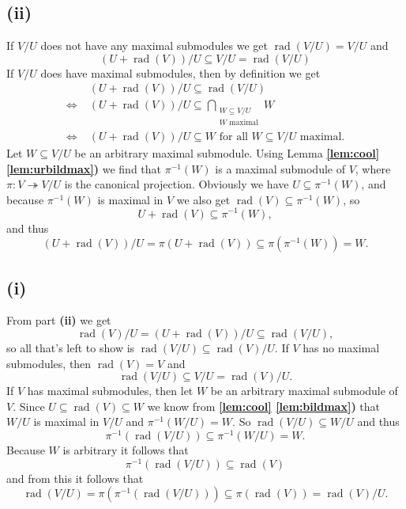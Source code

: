 \documentclass[a4paper,10pt]{article}
\theoremstyle{definition}
\newcommand{\rad}{\operatorname{rad}}
\begin{document}
\subsection*{(ii)}
If $V\!/U$ does not have any maximal submodules we get $\rad(V\!/U) = V\!/U$ and
\[
 (U+\rad(V))/U \subseteq V\!/U = \rad(V\!/U)
\]
If $V\!/U$ does have maximal submodules, then by definition we get
\begin{align*}
 &\; (U + \rad(V))/U \subseteq \rad(V\!/U) \\
 \Leftrightarrow&\; (U + \rad(V))/U \subseteq \bigcap_{\substack{W \subseteq V\!/U \\ W \text{ maximal}}} W \\
 \Leftrightarrow&\; (U + \rad(V))/U \subseteq W \text{ for all } W \subseteq V\!/U \text{ maximal}.
\end{align*}
Let $W \subseteq V\!/U$ be an arbitrary maximal submodule. Using Lemma \textbf{\ref{lem:cool} \ref{lem:urbildmax})} we find that $\pi^{-1}(W)$ is a maximal submodule of $V$, where $\pi : V \twoheadrightarrow V/U$ is the canonical projection. Obviously we have $U \subseteq \pi^{-1}(W)$, and because $\pi^{-1}(W)$ is maximal in $V$ we also get $\rad(V) \subseteq \pi^{-1}(W)$, so
\[
 U+\rad(V) \subseteq \pi^{-1}(W),
\]
and thus
\[
 (U+\rad(V))/U = \pi(U+\rad(V)) \subseteq \pi(\pi^{-1}(W)) = W.
\]


\subsection*{(i)}
From part \textbf{(ii)} we get
\[
 \rad(V)/U = (U+\rad(V))/U \subseteq \rad(V\!/U),
\]
so all that’s left to show is $\rad(V\!/U) \subseteq \rad(V)/U$. If $V$ has no maximal submodules, then $\rad(V) = V$ and
\[
 \rad(V\!/U) \subseteq V\!/U = \rad(V)/U.
\]
If $V$ has maximal submodules, then let $W$ be an arbitrary maximal submodule of $V$. Since $U \subseteq \rad(V) \subseteq W$ we know from \textbf{\ref{lem:cool} \ref{lem:bildmax})} that $W\!/U$ is maximal in $V\!/U$ and $\pi^{-1}(W\!/U) = W$. So $\rad(V\!/U) \subseteq W\!/U$ and thus
\[
 \pi^{-1}(\rad(V\!/U)) \subseteq \pi^{-1}(W\!/U) = W.
\]
Because $W$ is arbitrary it follows that
\[
 \pi^{-1}(\rad(V\!/U)) \subseteq \rad(V)
\]
and from this it follows that
\[
 \rad(V\!/U) = \pi(\pi^{-1}(\rad(V\!/U))) \subseteq \pi(\rad(V)) = \rad(V)/U.
\]
\end{document}
